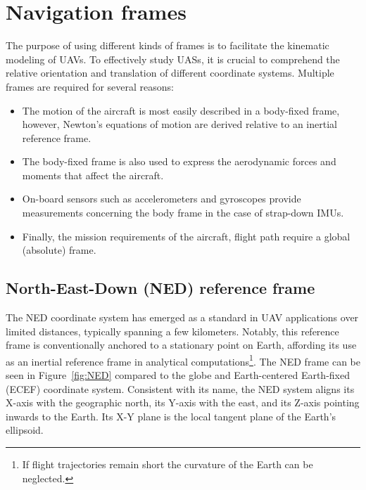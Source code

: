 \section{Navigation frames}

The purpose of using different kinds of frames is to facilitate the kinematic modeling of UAVs. To effectively study UASs, it is crucial to comprehend the relative orientation and translation of different coordinate systems. Multiple frames are required for several reasons:
\begin{itemize}
    \item 
    The motion of the aircraft is most easily described in a body-fixed frame, however, Newton's equations of motion are derived relative to an inertial reference frame.
    \item 
    The body-fixed frame is also used to express the aerodynamic forces and moments that affect the aircraft.
    \item
    On-board sensors such as accelerometers and gyroscopes provide measurements concerning the body frame in the case of strap-down IMUs.
    \item 
    Finally, the mission requirements of the aircraft, \eg{} flight path require a global (absolute) frame.
\end{itemize}

\subsection{North-East-Down (NED) reference frame}

The NED coordinate system has emerged as a standard in UAV applications over limited distances, typically spanning a few kilometers. Notably, this reference frame is conventionally anchored to a stationary point on Earth, affording its use as an inertial reference frame in analytical computations\footnote{If flight trajectories remain short the curvature of the Earth can be neglected.}. The NED frame can be seen in Figure~\ref{fig:NED} compared to the globe and Earth-centered Earth-fixed (ECEF) coordinate system. Consistent with its name, the NED system aligns its X-axis with the geographic north, its Y-axis with the east, and its Z-axis pointing inwards to the Earth. Its X-Y plane is the local tangent plane of the Earth's ellipsoid.

